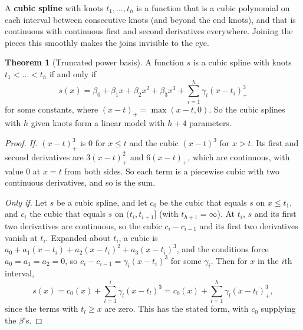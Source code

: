 \documentclass[11pt,a4paper]{article}
\numberwithin{equation}{section}
\theoremstyle{definition}
\newtheorem{thm}{Theorem}[subsection]
\begin{document}
A \textbf{cubic spline} with knots $t_1, \dots, t_h$ is a function that is a cubic polynomial on each interval between
consecutive knots (and beyond the end knots), and that is continuous with continuous first and second
derivatives everywhere. Joining the pieces this smoothly makes the joins invisible to the eye.

\begin{thm}[Truncated power basis]\label{thm:spline-basis}
A function $s$ is a cubic spline with knots $t_1 < \dots < t_h$ if and only if
\[
s(x) = \beta_{0} + \beta_{1}x + \beta_{2}x^2 + \beta_{3}x^3 + \sum_{i=1}^h \gamma_i(x - t_i)_+^3
\]
for some constants, where $(x - t)_+ = \max(x - t, 0)$. So the cubic splines with $h$ given knots form a
linear model with $h + 4$ parameters.
\end{thm}

\begin{proof}
\emph{If.} $(x - t)_+^3$ is $0$ for $x \le t$ and the cubic $(x - t)^3$ for $x > t$. Its first and second derivatives are
$3(x - t)_+^2$ and $6(x - t)_+$, which are continuous, with value $0$ at $x = t$ from both sides. So each term is a
piecewise cubic with two continuous derivatives, and so is the sum.

\emph{Only if.} Let $s$ be a cubic spline, and let $c_0$ be the cubic that equals $s$ on $x \le t_1$, and $c_i$ the cubic that
equals $s$ on $(t_i, t_{i+1}]$ (with $t_{h+1} = \infty$). At $t_i$, $s$ and its first two derivatives are continuous, so the cubic
$c_i - c_{i-1}$ and its first two derivatives vanish at $t_i$. Expanded about $t_i$, a cubic is
$a_0 + a_1(x - t_i) + a_2(x - t_i)^2 + a_3(x - t_i)^3$, and the conditions force $a_0 = a_1 = a_2 = 0$, so
$c_i - c_{i-1} = \gamma_i(x - t_i)^3$ for some $\gamma_i$. Then for $x$ in the $i$th interval,
\[
s(x) = c_0(x) + \sum_{l=1}^i \gamma_l(x - t_l)^3 = c_0(x) + \sum_{l=1}^h \gamma_l(x - t_l)_+^3 ,
\]
since the terms with $t_l \ge x$ are zero. This has the stated form, with $c_0$ supplying the $\beta$'s.
\end{proof}
\end{document}
